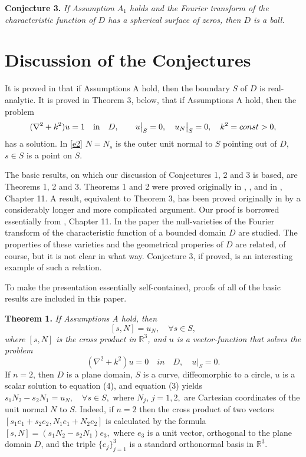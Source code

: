 \documentclass[12pt,leqno]{article}
\def\R{\mathbb{R}}
\begin{document}
{\bf Conjecture 3.} {\it  If Assumption $A_1$ holds and the Fourier
transform of the characteristic function of $D$ has a spherical surface of
zeros, then $D$ is a ball.}

\section{Discussion of the Conjectures}

It is proved in \cite{W} that if Assumptions A hold, then the boundary
$S$ of $D$ is real-analytic. It is proved in Theorem 3, below,  that
if Assumptions A hold, then  the problem
\begin{equation}
\label{e2}
 (\nabla^2 + k^2)u = 1\quad \text{in}\quad D,\qquad u\big{|}_S = 0,
\quad u_N\big{|}_S=0, \quad k^2 = const>0,
\end{equation}
has a solution.
In \eqref{e2} $N=N_s$ is the outer unit normal to $S$
pointing out
of $D$, $s\in S$ is a point on $S$.

The basic results, on which our discussion of Conjectures 1, 2 and 3 is
based, are Theorems 1, 2 and 3. Theorems 1 and 2 were proved originally in
\cite{R382}, \cite{R363},  and in
\cite{R470}, Chapter 11. A result, equivalent to Theorem 3, has been
proved originally in \cite{BST} by a considerably longer and more
complicated argument. Our proof is borrowed essentially from
\cite{R470}, Chapter 11.
In the paper \cite{K} the null-varieties of the Fourier transform of
the characteristic function of a bounded domain $D$  are studied.
The properties of these varieties and the geometrical properies
of $D$ are related, of course, but it is not clear in what way.
Conjecture 3, if proved, is an interesting example of such a relation.


To make
the presentation essentially self-contained,  proofs of all of the
basic results are included in this paper.

{\bf Theorem 1.}  {\it If Assumptions A hold, then
\begin{equation}
\label{e3}
[s,N]=u_N, \quad \forall s\in S,
\end{equation}
where $[s,N]$ is the cross product in $\R^3$, and $u$ is a
vector-function that solves the problem
\begin{equation}
\label{e4}
(\nabla^2+k^2)u=0 \quad in \quad D, \quad u|_S=0.
\end{equation}
}
If $n=2$, then $D$ is a plane domain, $S$ is a curve, diffeomorphic
to a circle, $u$ is a scalar solution to equation (4), and equation (3)
yields $s_1N_2-s_2N_1=u_N, \quad \forall s\in S,$
where $N_j$, $j=1,2,$ are Cartesian coordinates of the unit normal
$N$ to $S$.
Indeed, if $n=2$ then the cross product of two vectors
$[s_1e_1+s_2e_2, N_1e_1+N_2e_2]$ is calculated by the formula
$[s,N]=(s_1N_2-s_2N_1)e_3,$ where $e_3$ is a unit vector,
orthogonal to the plane domain $D$, and the triple $\{e_j\}_{j=1}^3$
is a standard orthonormal basis in $\R^3$.
\end{document}
